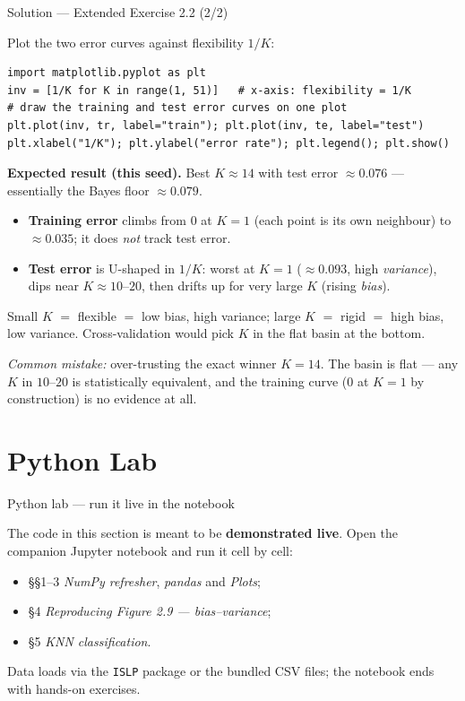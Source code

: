 \documentclass[aspectratio=169,11pt]{beamer}
\begin{document}
\begin{frame}[fragile]{Solution --- Extended Exercise 2.2 (2/2)}
\begin{solutionbox}
\scriptsize
Plot the two error curves against flexibility $1/K$:
\begin{lstlisting}
import matplotlib.pyplot as plt
inv = [1/K for K in range(1, 51)]   # x-axis: flexibility = 1/K
# draw the training and test error curves on one plot
plt.plot(inv, tr, label="train"); plt.plot(inv, te, label="test")
plt.xlabel("1/K"); plt.ylabel("error rate"); plt.legend(); plt.show()
\end{lstlisting}
\textbf{Expected result (this seed).} Best $K\approx14$ with test error $\approx0.076$ --- essentially the Bayes floor $\approx0.079$.
\begin{itemize}\setlength\itemsep{0pt}
  \item \textbf{Training error} climbs from $0$ at $K=1$ (each point is its own neighbour) to $\approx0.035$; it does \emph{not} track test error.
  \item \textbf{Test error} is U-shaped in $1/K$: worst at $K=1$ ($\approx0.093$, high \emph{variance}), dips near $K\approx10\text{--}20$, then drifts up for very large $K$ (rising \emph{bias}).
\end{itemize}
Small $K$ $=$ flexible $=$ low bias, high variance; large $K$ $=$ rigid $=$ high bias, low variance. Cross-validation would pick $K$ in the flat basin at the bottom.

\smallskip
\textit{Common mistake:} over-trusting the exact winner $K=14$. The basin is flat --- any $K$ in $10$--$20$ is statistically equivalent, and the training curve ($0$ at $K=1$ by construction) is no evidence at all.
\end{solutionbox}
\end{frame}





\section{Python Lab}

\begin{frame}{Python lab --- run it live in the notebook}
  \begin{labnote}
    The code in this section is meant to be \textbf{demonstrated live}. Open the companion Jupyter notebook and run it cell by cell:
    \begin{itemize}
      \item \S\S1--3 \emph{NumPy refresher}, \emph{pandas} and \emph{Plots};
      \item \S4 \emph{Reproducing Figure 2.9 --- bias--variance};
      \item \S5 \emph{KNN classification}.
    \end{itemize}
    Data loads via the \texttt{ISLP} package or the bundled CSV files; the notebook ends with hands-on exercises.
  \end{labnote}
\end{frame}
\end{document}
